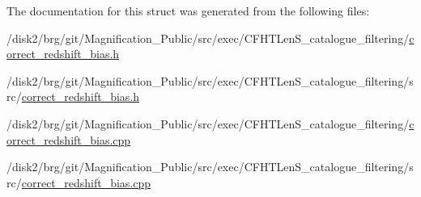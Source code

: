 The documentation for this struct was generated from the following files\-:\begin{DoxyCompactItemize}
\item 
/disk2/brg/git/\-Magnification\-\_\-\-Public/src/exec/\-C\-F\-H\-T\-Len\-S\-\_\-catalogue\-\_\-filtering/\hyperlink{correct__redshift__bias_8h}{correct\-\_\-redshift\-\_\-bias.\-h}\item 
/disk2/brg/git/\-Magnification\-\_\-\-Public/src/exec/\-C\-F\-H\-T\-Len\-S\-\_\-catalogue\-\_\-filtering/src/\hyperlink{src_2correct__redshift__bias_8h}{correct\-\_\-redshift\-\_\-bias.\-h}\item 
/disk2/brg/git/\-Magnification\-\_\-\-Public/src/exec/\-C\-F\-H\-T\-Len\-S\-\_\-catalogue\-\_\-filtering/\hyperlink{correct__redshift__bias_8cpp}{correct\-\_\-redshift\-\_\-bias.\-cpp}\item 
/disk2/brg/git/\-Magnification\-\_\-\-Public/src/exec/\-C\-F\-H\-T\-Len\-S\-\_\-catalogue\-\_\-filtering/src/\hyperlink{src_2correct__redshift__bias_8cpp}{correct\-\_\-redshift\-\_\-bias.\-cpp}\end{DoxyCompactItemize}

